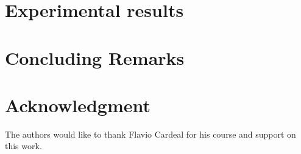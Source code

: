 \documentclass[10pt, conference]{IEEEtran}
\begin{document}
\section{Experimental results}

\section{Concluding Remarks}

\section*{Acknowledgment}
The authors would like to thank Flavio Cardeal for his course and support on this work.




\end{document}
